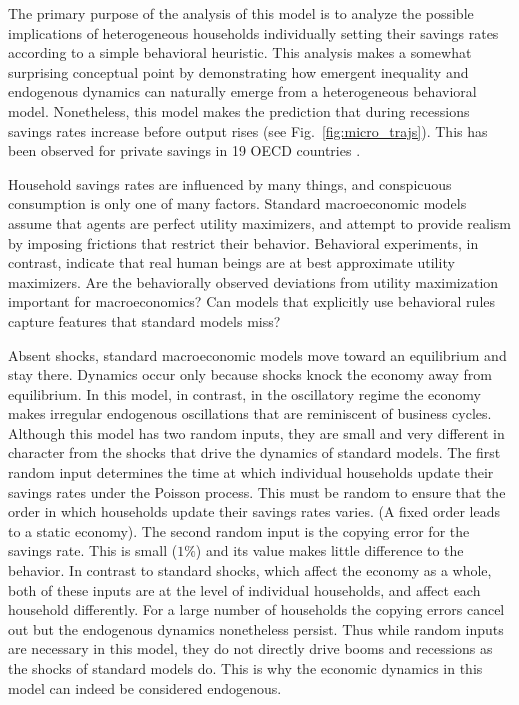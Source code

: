 The primary purpose of the analysis of this model is to analyze the possible implications of heterogeneous households individually setting their savings rates according to a simple behavioral heuristic. This analysis makes a somewhat surprising conceptual point by demonstrating how emergent inequality and endogenous dynamics can naturally emerge from a heterogeneous behavioral model. Nonetheless, this model makes the prediction that during recessions savings rates increase before output rises (see Fig.~\ref{fig:micro_trajs}).
This has been %
observed for private savings in 19 OECD countries \citep{adema2015business}. 

Household savings rates are influenced by many things, and conspicuous consumption is only one of many factors. Standard macroeconomic models assume that agents are perfect utility maximizers, and attempt to provide realism by imposing frictions that restrict their behavior. Behavioral experiments, in contrast, indicate that real human beings are at best approximate utility maximizers.  Are the behaviorally observed deviations from utility maximization important for macroeconomics?  Can models that explicitly use behavioral rules capture features that standard models miss?

Absent shocks, standard macroeconomic models move toward an equilibrium and stay there.   Dynamics occur only because shocks knock the economy away from equilibrium. In this model, in contrast, in the oscillatory regime the economy makes irregular endogenous oscillations that are reminiscent of business cycles.  
Although this model has two random inputs, they are small and very different in character from the shocks that drive the dynamics of standard models. The first random input determines the time at which individual households update their savings rates under the Poisson process.  This must be random to ensure that the order in which households update their savings rates varies.  (A fixed order leads to a static economy).  The second random input is the copying error for the savings rate.  This is small ($1\%$) and its value makes little difference to the behavior.  In contrast to standard shocks, which affect the economy as a whole, both of these inputs are at the level of individual households, and affect each household differently.  For a large number of households the copying errors cancel out but the endogenous dynamics nonetheless persist.  Thus while random inputs are necessary in this model, they do not directly drive booms and recessions as the shocks of standard models do.  This is why the economic dynamics in this model can indeed be considered endogenous.

